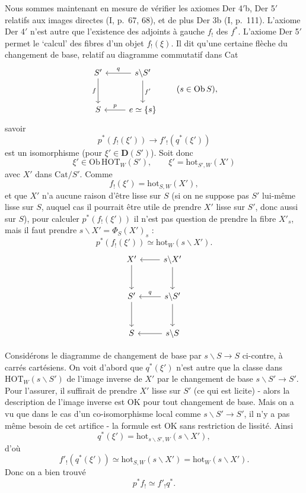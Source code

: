 \documentclass[11pt]{article}
\newcommand{\printedpage}[1]{\marginpar{\footnotesize p.~#1}}
\newcommand{\msp}[1]{\marginpar{\footnotesize [#1]}}
\newcommand{\hot}{\mathrm{hot}}
\newcommand{\HOT}{\mathrm{HOT}}
\newcommand{\Cat}{\mathrm{Cat}}
\begin{document}
Nous sommes maintenant en mesure de vérifier les axiomes Der 4$'$b, Der 5$'$ relatifs aux images directes (I, p.~67, 68), et de plus Der 3b (I, p.~111). L'axiome Der 4$'$ n'est autre que l'existence des adjoints à gauche $f_!$ des $f^*$. L'axiome Der 5$'$ permet le ‘calcul’ des fibres d'un objet $f_!(\xi)$. Il dit qu'une certaine
\printedpage{96}
\msp{157}
flèche du changement de base, relatif au diagramme commutatif dans Cat
\[\begin{tikzcd}[row sep=large]
S' \arrow[d,"f"'] & s\backslash S' \arrow[l,"q"'] \arrow[d,"f'"] \\
S & e\simeq\{s\} \arrow[l,"p"']
\end{tikzcd}\qquad(s\in\mathrm{Ob}\,S),\]
savoir
\[p^*(f_!(\xi'))\longrightarrow f'_!(q^*(\xi'))\]
est un isomorphisme (pour $\xi'\in\mathbf{D}(S')$). Soit donc
\[\xi'\in\mathrm{Ob}\,\HOT_W(S'),\qquad\xi'=\hot_{S',W}(X')\]
avec $X'$ dans $\Cat/S'$. Comme
\[f_!(\xi')=\hot_{S,W}(X'),\]
et que $X'$ n'a aucune raison d'être lisse sur $S$ (si on ne suppose pas $S'$ lui-même lisse sur $S$, auquel cas il pourrait être utile de prendre $X'$ lisse sur $S'$, donc aussi sur $S$), pour calculer $p^*(f_!(\xi'))$ il n'est pas question de prendre la fibre $X'_s$, mais il faut prendre $s\backslash X'=\Phi_S(X')_s$ :
\[p^*(f_!(\xi'))\simeq\hot_W(s\backslash X').\]
\[\begin{tikzcd}[row sep=large]
X' \arrow[d] & s\backslash X' \arrow[l] \arrow[d] \\
S' \arrow[d] & s\backslash S' \arrow[l,"q"'] \arrow[d] \\
S & s\backslash S \arrow[l]
\end{tikzcd}\]

Considérons le diagramme de changement de base par $s\backslash S\longrightarrow S$ ci-contre, à carrés cartésiens. On voit d'abord que $q^*(\xi')$ n'est autre que la classe dans $\HOT_W(s\backslash S')$ de l'image inverse de $X'$ par le changement de base $s\backslash S'\longrightarrow S'$. Pour l'assurer, il suffirait de prendre $X'$ lisse sur $S'$ (ce qui
\msp{158}
est licite) - alors la description de l'image inverse est OK pour tout changement de base. Mais on a vu que dans le cas d'un co-isomorphisme local comme $s\backslash S'\longrightarrow S'$, il n'y a pas même besoin de cet artifice - la formule est OK sans restriction de lissité. Ainsi
\[q^*(\xi')=\hot_{s\backslash S',W}(s\backslash X'),\]
\printedpage{97}
d'où
\[f'_!(q^*(\xi'))\simeq\hot_{S,W}(s\backslash X')=\hot_W(s\backslash X').\]
Donc on a bien trouvé
\[p^*f_!\simeq f'_!q^*.\]
\end{document}
